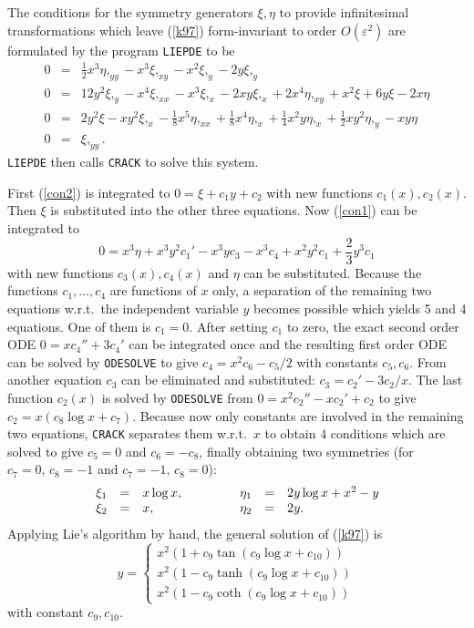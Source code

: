 The conditions for the symmetry generators $\xi, \eta$ to provide
infinitesimal transformations
which leave (\ref{k97}) form-invariant to order $O(\varepsilon^2)$ are
formulated by the program {\tt LIEPDE} to be
\begin{eqnarray}
0 & = & \frac{1}{2}x^3\eta,_{yy} - x^3\xi,_{xy} - x^2\xi,_y - 2y\xi,_y  
        \label{con1} \\
0 & = & 12y^2\xi,_y - x^4\xi,_{xx} - x^3\xi,_x - 2xy\xi,_x 
        + 2x^4\eta,_{xy} + x^2\xi + 6y\xi - 2x\eta  \\
0 & = & 2y^2\xi - xy^2\xi,_x - \frac{1}{8}x^5\eta,_{xx} 
        + \frac{1}{8}x^4\eta,_x
        + \frac{1}{4}x^2y\eta,_x + \frac{1}{2}xy^2\eta,_y 
        - xy\eta  \\
0 & = & \xi,_{yy}.   \label{con2}
\end{eqnarray}
{\tt LIEPDE} then calls {\tt CRACK} to solve this system.

First (\ref{con2}) is integrated to $0 = \xi + c_1y + c_2$
with new functions $c_1(x), c_2(x).$
Then $\xi$ is substituted into the other three equations. Now (\ref{con1})
can be integrated to
\[ 0 = x^3\eta + x^3y^2c_1' - x^3yc_3 - x^3c_4 + x^2y^2c_1 
       + \frac{2}{3}y^3c_1 \]
with new functions $c_3(x), c_4(x)$ and $\eta$ can be substituted.
Because the functions $c_1,\ldots,c_4$ are functions of $x$ only,
a separation of the remaining two equations w.r.t.\ the independent
variable $y$ becomes possible which yields 5 and 4 equations. One of
them is $c_1=0$.
After setting $c_1$ to zero, the exact second order ODE 
$0 = xc_4'' + 3c_4'$ can be integrated once and
the resulting first order ODE can be solved by 
{\tt ODESOLVE} \cite{Mal} to give $c_4 = x^2c_6 - c_5/2$
with constants $c_5, c_6$. From another equation $c_3$ can be eliminated
and substituted: $c_3 = c_2' - 3c_2/x$. The last function $c_2(x)$ is
solved by {\tt ODESOLVE} from $0 = x^2c_2'' - xc_2' + c_2$ to give
$c_2 = x(c_8\log x + c_7)$. Because now only constants are involved in
the remaining two equations, {\tt CRACK} separates them w.r.t.\ $x$ to obtain 4
conditions which are solved to give $c_5 = 0$ and $c_6 = - c_8$,
finally obtaining two symmetries (for $c_7 = 0, \, c_8 = -1$ and 
$c_7 = -1, \, c_8 = 0$): 
\[ 
\begin{array}{rclrcl}
 \xi_1 & = & x\log x,\hspace{0.5in}  & \eta_1 & = & 2y\log x + x^2 - y \\
 \xi_2 & = & x,                      & \eta_2 & = & 2y . 
\end{array} \]
Applying Lie's algorithm by hand, the general solution of (\ref{k97})
is \cite{Ka} 
\[ y = \left\{ \begin{array}{l}
                 x^2(1 + c_9\tan(c_9\log x + c_{10})) \\
                 x^2(1 - c_9\tanh(c_9\log x + c_{10})) \\
                 x^2(1 - c_9\coth(c_9\log x + c_{10})) 
               \end{array}
       \right. \]
with constant $c_9, c_{10}$.
       
